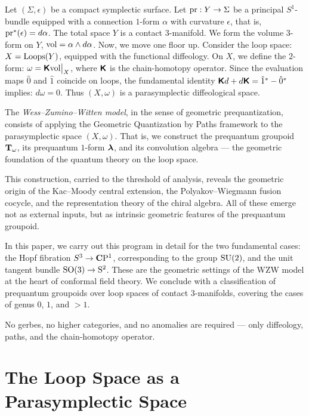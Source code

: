 \documentclass[11pt,reqno,letterpaper,twoside]{amsart}
\renewcommand{\TT}{\Groupoid{T}}
\newcommand{\CPOne}{{\fieldC\mathrm{P}^1}}
\begin{document}
  Let $(\Sigma, \epsilon)$ be a compact symplectic surface.
  Let $\pr: Y \to \Sigma$ be a principal $S^1$-bundle equipped with a connection $1$-form $\alpha$ with curvature $\epsilon$,
  that is,
  $\pr^*(\epsilon) = d\alpha$.
  The total space $Y$ is a contact $3$-manifold.
  We form the volume $3$-form on $Y$,
  $\mathrm{vol} = \alpha \wedge d\alpha$.
  Now,
  we move one floor up.
  Consider the loop space:
  $X = \operatorname{Loops}(Y)$,
  equipped with the functional diffeology.
  On $X$,
  we define the $2$-form:
  $\omega = \boldsymbol{\mathsf{K}}\mathrm{vol} \big|_X$,
  where $\boldsymbol{\mathsf{K}}$ is the chain-homotopy operator.
  Since the evaluation maps $\hat{0}$ and $\hat{1}$ coincide on loops,
  the fundamental identity $\boldsymbol{\mathsf{K}} d + d\boldsymbol{\mathsf{K}} = \hat{1}^* - \hat{0}^*$ implies:
  $d\omega = 0$.
  Thus $(X, \omega)$ is a parasymplectic diffeological space.
  
  The \emph{Wess--Zumino--Witten model},
  in the sense of geometric prequantization,
  consists of applying the Geometric Quantization by Paths framework
  to the parasymplectic space $(X, \omega)$.
  That is,
  we construct the prequantum groupoid $\TT_\omega$,
  its prequantum $1$-form $\boldsymbol \lambda$,
  and its convolution algebra ---
  the geometric foundation of the quantum theory on the loop space.
  
  This construction,
  carried to the threshold of analysis,
  reveals the geometric origin of
  the Kac--Moody central extension,
  the Polyakov--Wiegmann fusion cocycle,
  and the representation theory of the chiral algebra.
  All of these emerge not as external inputs,
  but as intrinsic geometric features of the prequantum groupoid.
  
  In this paper,
  we carry out this program in detail for the two fundamental cases:
  the Hopf fibration $S^3 \to \CPOne$,
  corresponding to the group $\mathrm{SU}(2)$,
  and the unit tangent bundle $\mathrm{SO}(3) \to \mathrm{S}^2$.
  These are the geometric settings of the WZW model
  at the heart of conformal field theory.
  We conclude with a classification of prequantum groupoids
  over loop spaces of contact $3$-manifolds,
  covering the cases of genus $0$, $1$, and $>1$.
  
  No gerbes,
  no higher categories,
  and no anomalies are required ---
  only diffeology,
  paths,
  and the chain-homotopy operator.
  
  \section{The Loop Space as a Parasymplectic Space}
  
\end{document}
